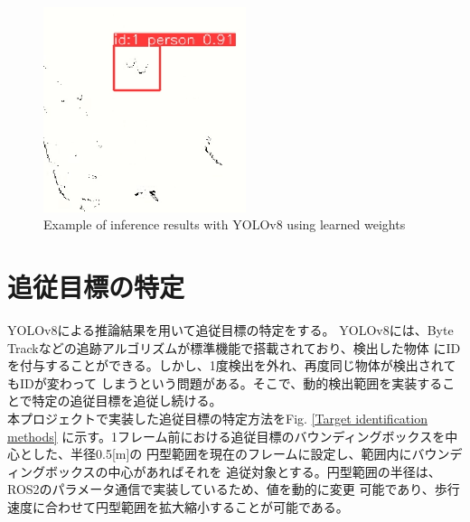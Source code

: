 \begin{figure}[h]
    \begin{center}
    \includegraphics[height=60mm,clip]{figure/yolov8_laser_img.png}
    \caption{Example of inference results with YOLOv8 using learned weights}
    \label{Example of inference results with YOLOv8 using learned weights}
    \end{center}
\end{figure}

\section{追従目標の特定}
YOLOv8による推論結果を用いて追従目標の特定をする。
YOLOv8には、Byte Trackなどの追跡アルゴリズムが標準機能で搭載されており、検出した物体
にIDを付与することができる。しかし、1度検出を外れ、再度同じ物体が検出されてもIDが変わって
しまうという問題がある。そこで、動的検出範囲を実装することで特定の追従目標を追従し続ける。\\ \indent
本プロジェクトで実装した追従目標の特定方法をFig. \ref{Target identification methods}
に示す。1フレーム前における追従目標のバウンディングボックスを中心とした、半径0.5[m]の
円型範囲を現在のフレームに設定し、範囲内にバウンディングボックスの中心があればそれを
追従対象とする。円型範囲の半径は、ROS2のパラメータ通信で実装しているため、値を動的に変更
可能であり、歩行速度に合わせて円型範囲を拡大縮小することが可能である。

